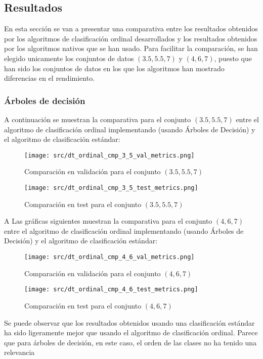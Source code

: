 \subsection{Resultados}
En esta sección se van a presentar una comparativa entre los resultados obtenidos por los algoritmos de clasificación ordinal desarrollados y los resultados obtenidos por los algoritmos nativos que se han usado. Para facilitar la comparación, se han elegido unicamente los conjuntos de datos $(3.5,5.5,7)$  y $(4,6,7)$, puesto que han sido los conjuntos de datos en los que los algoritmos han mostrado diferencias en el rendimiento.

\subsubsection*{Árboles de decisión}
\label{sec:ord_cmp_dt}
A continuación se muestran la comparativa para el conjunto $(3.5,5.5,7)$ entre el algoritmo de clasificación ordinal implementando  (usando Árboles de Decisión) y el algoritmo de clasificación estándar:
\begin{figure}[H]
	\centering
	\texttt{[image: src/dt\_ordinal\_cmp\_3\_5\_val\_metrics.png]}
	\caption{Comparación en validación para el conjunto  $(3.5,5.5,7)$ }
	\label{fig:dt_ordin_val_cmp_1}
\end{figure}
\begin{figure}[H]
	\centering
	\texttt{[image: src/dt\_ordinal\_cmp\_3\_5\_test\_metrics.png]}
	\caption{Comparación en test para el conjunto  $(3.5,5.5,7)$}
	\label{fig:dt_ordint_test_cmp_1}
\end{figure}
A
Las gráficas siguientes muestran la comparativa para el conjunto $(4,6,7)$ entre el algoritmo de clasificación ordinal implementando  (usando Árboles de Decisión) y el algoritmo de clasificación estándar:
\begin{figure}[H]
	\centering
	\texttt{[image: src/dt\_ordinal\_cmp\_4\_6\_val\_metrics.png]}
	\caption{Comparación en validación para el conjunto $(4,6,7)$}
	\label{fig:dt_ordin_val_cmp_2}
\end{figure}
\begin{figure}[H]
	\centering
	\texttt{[image: src/dt\_ordinal\_cmp\_4\_6\_test\_metrics.png]}
	\caption{Comparación en test para el conjunto  $(4,6,7)$}
	\label{fig:dt_ordint_test_cmp_2}
\end{figure}

Se puede observar que los resultados obtenidos usando una clasificación estándar ha sido ligeramente mejor que usando el algoritmo de clasificación ordinal. Parece que para árboles de decisión, en este caso, el orden de las clases no ha tenido una relevancia
